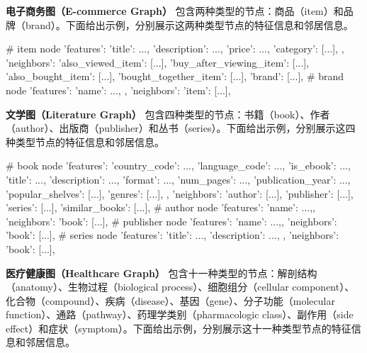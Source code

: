 \documentclass[11pt,UTF8,fontset=fandol]{ctexart}
\begin{document}
\textbf{电子商务图（E-commerce Graph）} 包含两种类型的节点：商品（item）和品牌（brand）。下面给出示例，分别展示这两种类型节点的特征信息和邻居信息。

\begin{code}
# item node
{
    'features': {
        'title': ...,
        'description': ...,
        'price': ...,
        'category': [...],
        },
    'neighbors': {
        'also_viewed_item': [...],
        'buy_after_viewing_item': [...],
        'also_bought_item': [...],
        'bought_together_item': [...],
        'brand': [...],
        }
}
# brand node
{
    'features': {
        'name': ...,
        },
    'neighbors': {
        'item': [...],
        }
}
\end{code}

\textbf{文学图（Literature Graph）} 包含四种类型的节点：书籍（book）、作者（author）、出版商（publisher）和丛书（series）。下面给出示例，分别展示这四种类型节点的特征信息和邻居信息。

\begin{code}
# book node
{
    'features': {
        'country_code': ...,
        'language_code': ...,
        'is_ebook': ...,
        'title': ...,
        'description': ...,
        'format': ...,
        'num_pages': ...,
        'publication_year': ...,
        'popular_shelves': [...],
        'genres': [...],
        },
    'neighbors': {
        'author': [...],
        'publisher': [...],
        'series': [...],
        'similar_books': [...],
        }
}
# author node
{
    'features': {'name': ...,},
    'neighbors': {'book': [...],}
}
# publisher node
{
    'features': {'name': ...,},
    'neighbors': {'book': [...],}
}
# series node
{
    'features': {
        'title': ...,
        'description': ...,
        },
    'neighbors': {'book': [...],}
}
\end{code}

\textbf{医疗健康图（Healthcare Graph）} 包含十一种类型的节点：解剖结构（anatomy）、生物过程（biological process）、细胞组分（cellular component）、化合物（compound）、疾病（disease）、基因（gene）、分子功能（molecular function）、通路（pathway）、药理学类别（pharmacologic class）、副作用（side effect）和症状（symptom）。下面给出示例，分别展示这十一种类型节点的特征信息和邻居信息。
\end{document}
